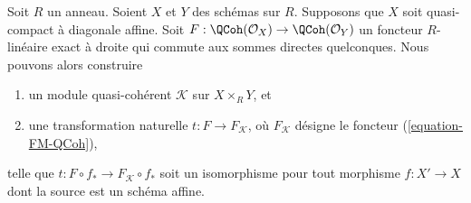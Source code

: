 \begin{lemma}
\label{lemma-functor-quasi-coherent-from-affine-diagonal-pre}
Soit $R$ un anneau. Soient $X$ et $Y$ des schémas sur $R$. Supposons que $X$
soit quasi-compact à diagonale affine. Soit
$F : \QCoh(\mathcal{O}_X) \to \QCoh(\mathcal{O}_Y)$
un foncteur $R$-linéaire exact à droite qui commute
aux sommes directes quelconques. Nous pouvons alors construire
\begin{enumerate}
\item un module quasi-cohérent $\mathcal{K}$ sur $X \times_R Y$, et
\item une transformation naturelle $t : F \to F_\mathcal{K}$,
où $F_\mathcal{K}$ désigne le foncteur (\ref{equation-FM-QCoh}),
\end{enumerate}
telle que $t : F \circ f_* \to F_\mathcal{K} \circ f_*$ soit un isomorphisme
pour tout morphisme $f : X' \to X$ dont la source est un schéma affine.
\end{lemma}

